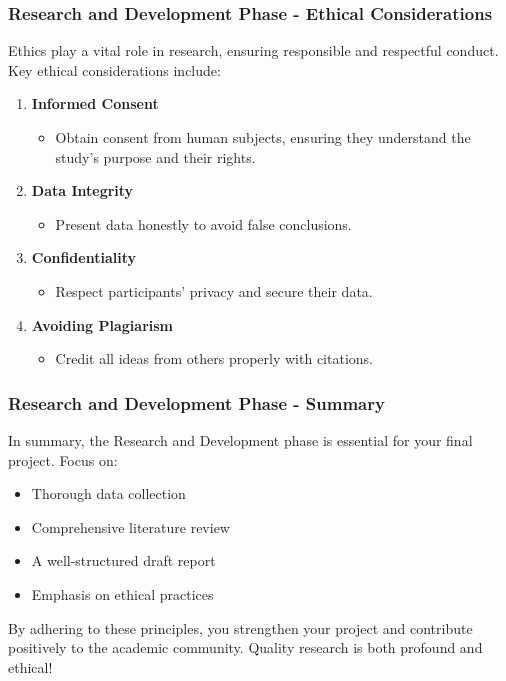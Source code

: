 \documentclass{beamer}
\begin{document}
\begin{frame}[fragile]
    \frametitle{Research and Development Phase - Ethical Considerations}
    Ethics play a vital role in research, ensuring responsible and respectful conduct. Key ethical considerations include:
    
    \begin{enumerate}
        \item \textbf{Informed Consent} 
            \begin{itemize}
                \item Obtain consent from human subjects, ensuring they understand the study's purpose and their rights.
            \end{itemize}
        
        \item \textbf{Data Integrity} 
            \begin{itemize}
                \item Present data honestly to avoid false conclusions.
            \end{itemize}
        
        \item \textbf{Confidentiality} 
            \begin{itemize}
                \item Respect participants' privacy and secure their data.
            \end{itemize}
        
        \item \textbf{Avoiding Plagiarism} 
            \begin{itemize}
                \item Credit all ideas from others properly with citations.
            \end{itemize}
    \end{enumerate}
\end{frame}

\begin{frame}[fragile]
    \frametitle{Research and Development Phase - Summary}
    In summary, the Research and Development phase is essential for your final project. Focus on:
    
    \begin{itemize}
        \item Thorough data collection
        \item Comprehensive literature review
        \item A well-structured draft report
        \item Emphasis on ethical practices
    \end{itemize}
    
    By adhering to these principles, you strengthen your project and contribute positively to the academic community. Quality research is both profound and ethical!
\end{frame}
\end{document}
